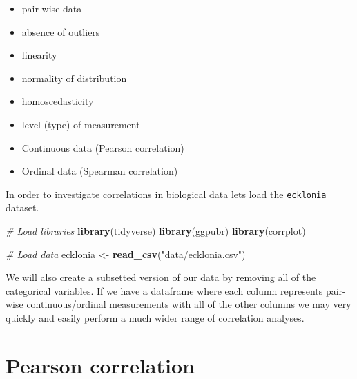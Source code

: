 \documentclass[english,10pt,a4paper,oneside]{book}
\providecommand{\tightlist}{%
  \setlength{\itemsep}{0pt}\setlength{\parskip}{0pt}}
\newenvironment{Shaded}{\begin{snugshade}}{\end{snugshade}}
\newcommand{\KeywordTok}[1]{\textcolor[rgb]{0.13,0.29,0.53}{\textbf{#1}}}
\newcommand{\StringTok}[1]{\textcolor[rgb]{0.31,0.60,0.02}{#1}}
\newcommand{\CommentTok}[1]{\textcolor[rgb]{0.56,0.35,0.01}{\textit{#1}}}
\newcommand{\OperatorTok}[1]{\textcolor[rgb]{0.81,0.36,0.00}{\textbf{#1}}}
\newcommand{\NormalTok}[1]{#1}
\theoremstyle{definition}
\theoremstyle{definition}
\theoremstyle{definition}
\theoremstyle{remark}
\begin{document}
\begin{itemize}
\tightlist
\item
  pair-wise data
\item
  absence of outliers
\item
  linearity
\item
  normality of distribution
\item
  homoscedasticity
\item
  level (type) of measurement
\item
  Continuous data (Pearson correlation)
\item
  Ordinal data (Spearman correlation)
\end{itemize}

In order to investigate correlations in biological data lets load the
\texttt{ecklonia} dataset.

\begin{Shaded}
\begin{Highlighting}[]
\CommentTok{# Load libraries}
\KeywordTok{library}\NormalTok{(tidyverse)}
\KeywordTok{library}\NormalTok{(ggpubr)}
\KeywordTok{library}\NormalTok{(corrplot)}

\CommentTok{# Load data}
\NormalTok{ecklonia <-}\StringTok{ }\KeywordTok{read_csv}\NormalTok{(}\StringTok{"data/ecklonia.csv"}\NormalTok{)}
\end{Highlighting}
\end{Shaded}

We will also create a subsetted version of our data by removing all of
the categorical variables. If we have a dataframe where each column
represents pair-wise continuous/ordinal measurements with all of the
other columns we may very quickly and easily perform a much wider range
of correlation analyses.

\begin{Shaded}
\end{Shaded}

\section{Pearson correlation}\label{pearson-correlation}
\end{document}
